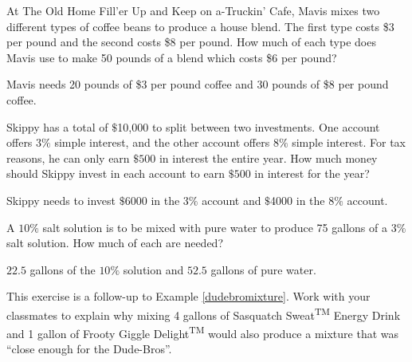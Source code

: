 \documentclass{ximera}
\begin{document}
\begin{problem}
At The Old Home Fill'er Up and Keep on a-Truckin' Cafe, Mavis mixes two different types of coffee beans to produce a house blend.   The first type costs \$3 per pound and the second costs \$8 per pound.  How much of each type does Mavis use to make 50 pounds of a blend which costs \$6 per pound?

\begin{solution}
Mavis needs 20 pounds of \$3 per pound coffee and 30 pounds of \$8 per pound coffee.
\end{solution}
\end{problem}

\begin{problem}
Skippy has a total of $\$$10,000 to split between two investments.  One account offers $3\%$ simple interest, and the other account offers $8\%$ simple interest.  For tax reasons, he can only earn $\$500$ in interest the entire year.  How much money should Skippy invest in each account to earn $\$500$ in interest for the year?

\begin{solution}
Skippy needs to invest $\$$6000 in the $3\%$ account and $\$$4000 in the $8 \%$ account.
\end{solution}
\end{problem}

\begin{problem}
A $10 \%$ salt solution is to be mixed with pure water to produce 75 gallons of a $3\%$ salt solution.  How much of each are needed?

\begin{solution}
$22.5$ gallons of the $10 \%$ solution and $52.5$ gallons of pure water.

\end{solution}
\end{problem}

\begin{problem}
This exercise is a follow-up to Example \ref{dudebromixture}.  Work with your classmates to explain why mixing 4 gallons of Sasquatch Sweat\textsuperscript{TM} Energy Drink and 1 gallon of Frooty Giggle Delight\textsuperscript{TM} would also produce a mixture that was ``close enough for the Dude-Bros''.
\end{problem}
\end{document}
